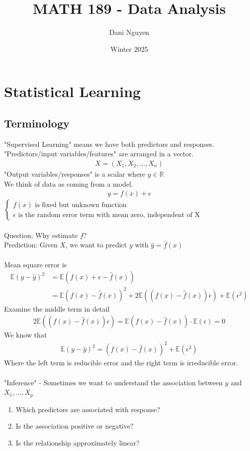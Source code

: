 \documentclass[12pt, letterpaper]{article}
\title{MATH 189 - Data Analysis}
\author{Dani Nguyen}
\date{Winter 2025}
\begin{document}
\maketitle
\tableofcontents

\section{Statistical Learning}
\subsection{Terminology}
"Supervised Learning"  means we have both predictors and responses. \\
"Predictors/input variables/features" are arranged in a vector.
\begin{align*}
    X = (X_1,X_2,...,X_n)
\end{align*}
"Output variables/responses" is a scalar where $y \in \mathbb{R}$ \\
We think of data as coming from a model.
\begin{align*}
    y = f(x) + \epsilon
\end{align*}
$\begin{cases}
    f(x) \text{ is fixed but unknown function} \\
    \epsilon \text{ is the random error term with mean zero, independent of X}
\end{cases}$ \\ \\
Question: Why estimate $f$? \\
Prediction: Given $X$, we want to predict $y$ with $\hat{y} = \hat{f}(x)$ \\ \\ 
Mean square error is 
\begin{align*}
    \mathbb{E}(y-\hat{y})^2 &= \mathbb{E}(f(x)+\epsilon - \hat{f}(x)) \\
    &= \mathbb{E}(f(x)-\hat{f}(x))^2 + 2\mathbb{E}((f(x) - \hat{f}(x))\epsilon) + \mathbb{E}(\epsilon^2)
\end{align*}
Examine the middle term in detail 
\begin{align*}
    2\mathbb{E}((f(x) - \hat{f}(x))\epsilon)
    = \mathbb{E}(f(x)-\hat{f}(x))\cdot\mathbb{E}(\epsilon)=0
\end{align*}
We know that 
\begin{align*}
    \mathbb{E}(y-\hat{y})^2 = (f(x)-\hat{f}(x))^2 + \mathbb{E}(\epsilon^2)
\end{align*}
Where the left term is reducible error and the right term is irreducible error. \\ \\ 
"Inference" - Sometimes we want to understand the association between $y$ and $X_1, ... ,X_p$ 
\begin{enumerate}
    \item Which predictors are associated with response?
    \item Is the association positive or negative?
    \item Is the relationship approximately linear?
\end{enumerate}
\end{document}
